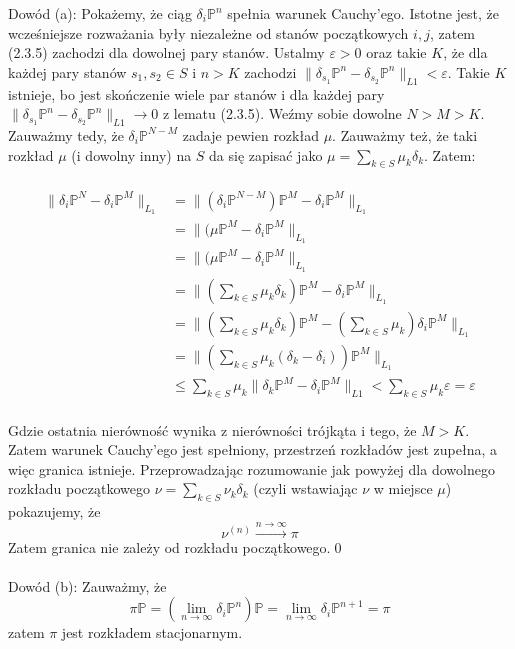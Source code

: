 \documentclass[a4paper]{article}
\begin{document}
Dowód (a): Pokażemy, że ciąg $\delta_i\mathbb{P}^n$ spełnia warunek Cauchy'ego. Istotne jest, że wcześniejsze rozważania były niezależne od stanów początkowych $i, j$, zatem (2.3.5) zachodzi dla dowolnej pary stanów. Ustalmy $\varepsilon > 0$ oraz takie $K$, że dla każdej pary stanów $s_1, s_2 \in S$ i $n > K$  zachodzi $\|\delta_{s_1}\mathbb{P}^n - \delta_{s_2}\mathbb{P}^n\|_{L1} < \varepsilon$. Takie $K$ istnieje, bo jest skończenie wiele par stanów i dla każdej pary $\|\delta_{s_1}\mathbb{P}^n - \delta_{s_2}\mathbb{P}^n\|_{L1} \to 0$ z lematu (2.3.5). Weźmy sobie dowolne $N > M > K$. Zauważmy tedy, że $\delta_i\mathbb{P}^{N-M}$ zadaje pewien rozkład $\mu$. Zauważmy też, że taki rozkład $\mu$ (i dowolny inny) na $S$ da się zapisać jako $\mu = \sum\limits_{k \in S} \mu_k\delta_k$. Zatem:\\\\
\begin{align*}
\|\delta_i\mathbb{P}^N - \delta_i\mathbb{P}^M\|_{L_1} &= \|(\delta_i\mathbb{P}^{N-M})\mathbb{P}^{M} - \delta_i\mathbb{P}^M\|_{L_1}\\  
&= \|(\mu\mathbb{P}^{M} - \delta_i\mathbb{P}^M\|_{L_1} \\ 
&= \|(\mu\mathbb{P}^{M} - \delta_i\mathbb{P}^M\|_{L_1} \\
&= \|(\sum\limits_{k \in S} \mu_k\delta_k)\mathbb{P}^{M} - \delta_i\mathbb{P}^M\|_{L_1} \\
&= \|(\sum\limits_{k \in S} \mu_k\delta_k)\mathbb{P}^{M} - (\sum\limits_{k \in S} \mu_k)\delta_i\mathbb{P}^M\|_{L_1} \\
&= \|(\sum\limits_{k \in S} \mu_k(\delta_k - \delta_i))\mathbb{P}^{M}\|_{L_1}  \\
&\leq  \sum\limits_{k \in S} \mu_k\|\delta_k\mathbb{P}^M - \delta_i\mathbb{P}^M\|_{L1} < \sum\limits_{k \in S} \mu_k\varepsilon = \varepsilon
\end{align*}
\\
Gdzie ostatnia nierówność wynika z nierówności trójkąta i tego, że $M > K$. Zatem warunek Cauchy'ego jest spełniony, przestrzeń rozkładów jest zupełna, a więc granica istnieje. Przeprowadzając rozumowanie jak powyżej dla dowolnego rozkładu początkowego $\nu = \sum\limits_{k \in S} \nu_k\delta_k$ (czyli wstawiając $\nu$ w miejsce $\mu$) pokazujemy, że $$\nu^{(n)} \xrightarrow{n \to \infty} \pi$$ Zatem granica nie zależy od rozkładu początkowego.\qed \\\\
Dowód (b): Zauważmy, że $$\pi\mathbb{P} = (\lim\limits_{n \to \infty} \delta_i\mathbb{P}^n)\mathbb{P} = \lim\limits_{n \to \infty} \delta_i\mathbb{P}^{n+1} = \pi$$ zatem $\pi$ jest rozkładem stacjonarnym.
\end{document}
